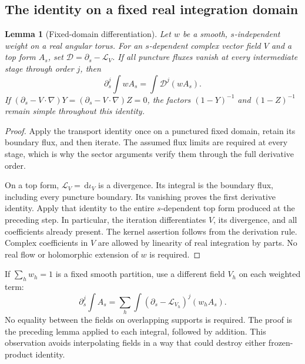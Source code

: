 \documentclass[11pt]{article}
\numberwithin{equation}{section}
\newtheorem{lemma}[theorem]{Lemma}
\theoremstyle{definition}
\newcommand{\dd}{\,\mathrm d}
\newcommand{\Li}{\mathcal L}
\begin{document}
\subsection{The identity on a fixed real integration domain}
\begin{lemma}[Fixed-domain differentiation]\label{lem:lie}
Let \(w\) be a smooth, \(s\)-independent weight on a real angular torus.
For an \(s\)-dependent complex vector field \(V\) and a top form \(A_s\),
set \(\mathcal D=\partial_s-\Li_V\). If all puncture fluxes vanish
at every intermediate stage through order \(j\), then
\[
 \partial_s^j\int wA_s=\int\mathcal D^j(wA_s).
\]
If \((\partial_s-V\cdot\nabla)Y
=(\partial_s-V\cdot\nabla)Z=0\), the factors
\((1-Y)^{-1}\) and \((1-Z)^{-1}\) remain simple throughout this identity.
\end{lemma}
\begin{proof}
Apply the transport identity once on a punctured fixed domain, retain its boundary flux, and then iterate. The assumed flux limits are required at every stage, which is why the sector arguments verify them through the full derivative order.

On a top form, \(\Li_V=\dd\iota_V\) is a divergence. Its integral is the
boundary flux, including every puncture boundary. Its vanishing proves
the first derivative identity. Apply that identity to the entire
\(s\)-dependent top form produced at the preceding step. In particular,
the iteration differentiates \(V\), its divergence, and all coefficients
already present. The kernel assertion follows from the derivation rule.
Complex coefficients in \(V\) are allowed by linearity of real
integration by parts. No real flow or holomorphic extension of \(w\)
is required.
\end{proof}

If \(\sum_h w_h=1\) is a fixed smooth partition, use a different field
\(V_h\) on each weighted term:
\begin{equation}
 \partial_s^j\int A_s
   =\sum_h\int(\partial_s-\Li_{V_h})^j(w_hA_s).
 \label{eq:chartwiseLie}
\end{equation}
No equality between the fields on overlapping supports is required.
The proof is the preceding lemma applied to each integral, followed
by addition. This observation avoids interpolating fields in a way
that could destroy either frozen-product identity.
\end{document}
